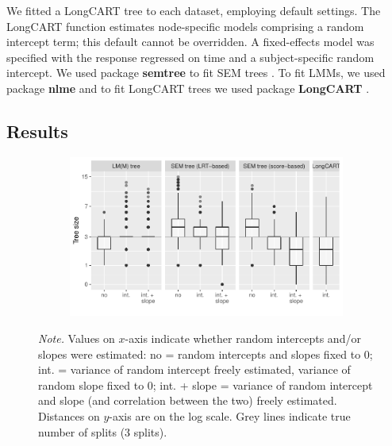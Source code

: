 \documentclass[doc,floatsintext,natbib]{apa7}
\begin{document}
We fitted a LongCART tree to each dataset, employing default settings. The LongCART function estimates node-specific models comprising a random intercept term; this default cannot be overridden. A fixed-effects model was specified with the response regressed on time and a subject-specific random intercept. We used package \textbf{semtree} to fit SEM trees \citep[][version 0.9.17]{BranyOert13}. To fit LMMs, we used package \textbf{nlme} \citep[version 3.1-153][]{PinhyBate00} and to fit LongCART trees we used package \textbf{LongCART} \citep[version 3.1][]{Kund21}.    


\subsection{Results}








\begin{figure}[!ht]
\caption{Tree size distributions for LM(M) trees with clustered covariances, SEM trees and LongCART.}
\begin{subfigure}{1.2\textwidth}
\includegraphics{_Partitioning_GCMs_with_GLMM_trees-014}
\end{subfigure}
{\footnotesize \textit{Note.} Values on $x$-axis indicate whether random intercepts and/or slopes were estimated: no = random intercepts and slopes fixed to 0; int. = variance of random intercept freely estimated, variance of random slope fixed to 0; int. + slope = variance of random intercept and slope (and correlation between the two) freely estimated. Distances on $y$-axis are on the log scale. Grey lines indicate true number of splits (3 splits).}
\label{fig:tree_sizes}
\end{figure}
\end{document}
